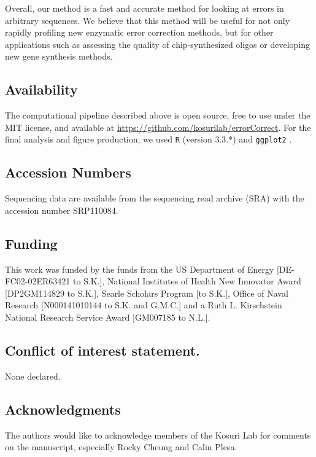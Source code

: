 \documentclass[twocolumn]{article}
\begin{document}
Overall, our method is a fast and accurate method for looking at errors in arbitrary sequences. We believe that this method will be useful for not only rapidly profiling new enzymatic error correction methods, but for other applications such as assessing the quality of chip-synthesized oligos or developing new gene synthesis methods.


\subsection*{Availability}
The computational pipeline described above is open source, free to use under the MIT license, and available at \url{https://github.com/kosurilab/errorCorrect}. For the final analysis and figure production, we used \texttt{R} (version 3.3.*) and \texttt{ggplot2} \cite{R,ggplot}.

\subsection*{Accession Numbers}
Sequencing data are available from the sequencing read archive (SRA) with the accession number SRP110084.

\subsection*{Funding}
This work was funded by the funds from the US Department of Energy [DE-FC02-02ER63421 to S.K.], National Institutes of Health New Innovator Award [DP2GM114829 to S.K.], Searle Scholars Program [to S.K.], Office of Naval Research [N000141010144 to S.K. and G.M.C.] and a Ruth L. Kirschstein National Research Service Award [GM007185 to N.L.].

\subsection*{Conflict of interest statement.}
None declared.

\subsection*{Acknowledgments}
The authors would like to acknowledge members of the Kosuri Lab for comments on the manuscript, especially Rocky Cheung and Calin Plesa.

\end{document}
